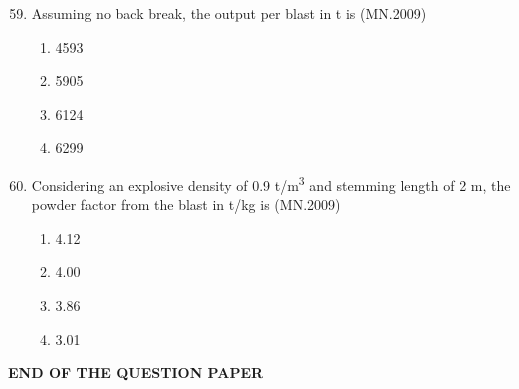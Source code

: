 \documentclass[journal]{IEEEtran}
\numberwithin{equation}{enumi}
\numberwithin{figure}{enumi}
\begin{document}
\begin{enumerate}[label=Q.\arabic*]
\setcounter{enumi}{58}

\item Assuming no back break, the output per blast in t is  
\hfill(MN.2009)

\begin{multicols}{2}
\begin{enumerate}[label=(\Alph*)]
\item 4593  
\item 5905  
\item 6124  
\item 6299  
\end{enumerate}
\end{multicols}

\item Considering an explosive density of 0.9 t/m\textsuperscript{3} and stemming length of 2 m, the powder factor from the blast in t/kg is  
\hfill(MN.2009)

\begin{multicols}{2}
\begin{enumerate}[label=(\Alph*)]
\item 4.12  
\item 4.00  
\item 3.86  
\item 3.01  
\end{enumerate}
\end{multicols}

\end{enumerate}

\begin{center}
\textbf{END OF THE QUESTION PAPER}
\end{center}
\end{document}
